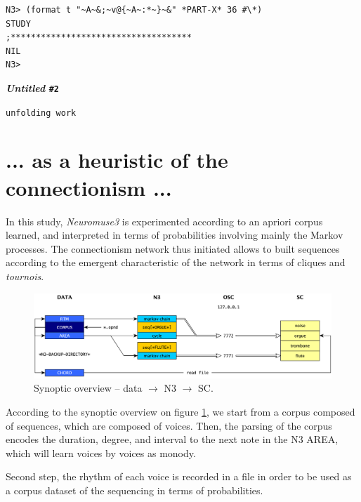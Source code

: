 \documentclass{article}
\begin{document}


\pagecolor{white}
\begin{lstlisting}[language=sectitle]
N3> (format t "~A~&;~v@{~A~:*~}~&" *PART-X* 36 #\*)
STUDY
;************************************
NIL
N3> 
\end{lstlisting}

\bigskip
\begin{center}
{\Large \textbf{\textit{Untitled} \texttt{\#2}}}

\texttt{unfolding work}
\end{center}

\section{... as a heuristic of the connectionism ...}
\label{ann:color}

\bigskip

In this study, \textsl{Neuromuse3} is experimented according to an apriori corpus learned, and interpreted in terms of probabilities involving mainly the Markov processes. The connectionism network thus initiated allows to built sequences according to the emergent characteristic of the network in terms of cliques and \textit{tournois}.

\begin{figure}[h]
\centering
\includegraphics[width=\textwidth]{../img/9901}
\caption{Synoptic overview -- data $\rightarrow$ N3 $\rightarrow$ SC.}
\label{global}
\end{figure}

According to the synoptic overview on figure \ref{global}, we start from a corpus composed of sequences, which are composed of voices. Then, the parsing of the corpus encodes the duration, degree, and interval to the next note in the N3 AREA, which will learn voices by voices as monody. 

Second step, the rhythm of each voice is recorded in a file in order to be used as a corpus dataset of the sequencing in terms of probabilities.
\end{document}
